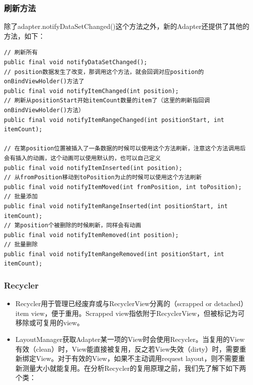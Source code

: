 \documentclass[9pt, b5paper]{article}
\begin{document}
\subsubsection{刷新方法}
\label{sec-5-3-6}
除了adapter.notifyDataSetChanged()这个方法之外，新的Adapter还提供了其他的方法，如下：
\begin{verbatim}
// 刷新所有
public final void notifyDataSetChanged();
// position数据发生了改变，那调用这个方法，就会回调对应position的onBindViewHolder()方法了
public final void notifyItemChanged(int position);
// 刷新从positionStart开始itemCount数量的item了（这里的刷新指回调onBindViewHolder()方法）
public final void notifyItemRangeChanged(int positionStart, int itemCount);

// 在第position位置被插入了一条数据的时候可以使用这个方法刷新，注意这个方法调用后会有插入的动画，这个动画可以使用默认的，也可以自己定义
public final void notifyItemInserted(int position);
// 从fromPosition移动到toPosition为止的时候可以使用这个方法刷新
public final void notifyItemMoved(int fromPosition, int toPosition);
// 批量添加
public final void notifyItemRangeInserted(int positionStart, int itemCount);
// 第position个被删除的时候刷新，同样会有动画
public final void notifyItemRemoved(int position);
// 批量删除
public final void notifyItemRangeRemoved(int positionStart, int itemCount);
\end{verbatim}

\subsubsection{Recycler}
\label{sec-5-3-7}
\begin{itemize}
\item Recycler用于管理已经废弃或与RecyclerView分离的（scrapped or detached）item view，便于重用。Scrapped view指依附于RecyclerView，但被标记为可移除或可复用的view。
\item LayoutManager获取Adapter某一项的View时会使用Recycler。当复用的View有效（clean）时，View能直接被复用，反之若View失效（dirty）时，需要重新绑定View。对于有效的View，如果不主动调用request layout，则不需要重新测量大小就能复用。在分析Recycler的复用原理之前，我们先了解下如下两个类：
\end{itemize}
\end{document}
